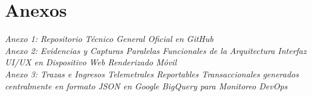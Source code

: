 \documentclass[12pt, a4paper]{article}
\begin{document}
\section{Anexos}
\textit{Anexo 1: Repositorio Técnico General Oficial en GitHub}\\
\textit{Anexo 2: Evidencias y Capturas Paralelas Funcionales de la Arquitectura Interfaz UI/UX en Dispositivo Web Renderizado Móvil}\\
\textit{Anexo 3: Trazas e Ingresos Telemetrales Reportables Transaccionales generados centralmente en formato JSON en Google BigQuery para Monitoreo DevOps}\\
\end{document}
